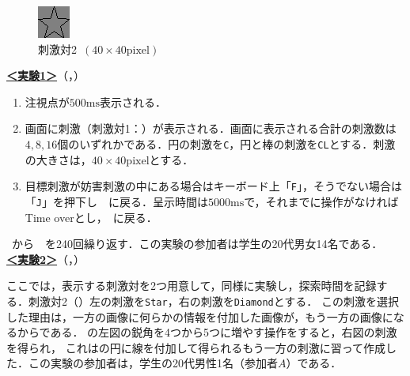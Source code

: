 \begin{figure}
\begin{minipage}[t]{.13\textwidth}
        \includegraphics[keepaspectratio,width=\textwidth]{../../13_BehavioralExperiment/star.png}
    \end{minipage}
    \caption{刺激対2\ \((40\times 40\textrm{pixel})\)}
    \label{fig:刺激対2}
    \vspace{-1cm}
\end{figure}
\noindent\textbf{\underline{＜実験1＞}}（，）
\begin{enumerate}
    \renewcommand{\labelenumi}{\fbox{\theenumi}}
    \item 注視点が\(500\textrm{ms}\)表示される．
    \item 画面に刺激（刺激対1：）が表示される．画面に表示される合計の刺激数は\(4,8,16\)個のいずれかである．円の刺激を\texttt{C}，円と棒の刺激を\texttt{CL}とする．刺激の大きさは，\(40\times40\textrm{pixel}\)とする．
    \item 目標刺激が妨害刺激の中にある場合はキーボード上「\texttt{F}」，そうでない場合は「\texttt{J}」を押下し\ \ に戻る．呈示時間は\(5000\textrm{ms}\)で，それまでに操作がなければTime overとし，\ に戻る．
\end{enumerate}
\ から\ \ を240回繰り返す．この実験の参加者は学生の20代男女14名である．\\
\textbf{\underline{＜実験2＞}}（，）\par
ここでは，表示する刺激対を2つ用意して，同様に実験し，探索時間を記録する．刺激対2（）左の刺激を\texttt{Star}，右の刺激を\texttt{Diamond}とする．
この刺激を選択した理由は，一方の画像に何らかの情報を付加した画像が，もう一方の画像になるからである．
の左図の鋭角を4つから5つに増やす操作をすると，右図の刺激を得られ，
これはの円に線を付加して得られるもう一方の刺激に習って作成した．この実験の参加者は，学生の20代男性1名（参加者\(A\)）である．

